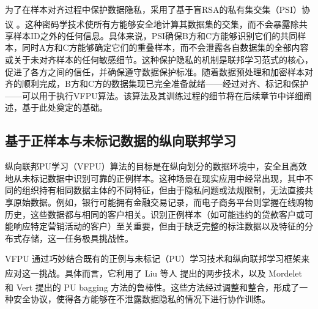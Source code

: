 为了在样本对齐过程中保护数据隐私，采用了基于盲RSA的私有集交集（PSI）协议 \textsuperscript{\cite{de2010practical}}。这种密码学技术使所有方能够安全地计算其数据集的交集，而不会暴露除共享样本ID之外的任何信息。具体来说，PSI确保B方和C方能够识别它们的共同样本，同时A方和C方能够确定它们的重叠样本，而不会泄露各自数据集的全部内容或关于未对齐样本的任何敏感细节。这种保护隐私的机制是联邦学习范式的核心，促进了各方之间的信任，并确保遵守数据保护标准。随着数据预处理和加密样本对齐的顺利完成，B方和C方的数据集现已完全准备就绪——经过对齐、标记和保护——可以用于执行VFPU算法。该算法及其训练过程的细节将在后续章节中详细阐述，基于此处奠定的基础。


\subsection{基于正样本与未标记数据的纵向联邦学习}
纵向联邦PU学习（VFPU）算法的目标是在纵向划分的数据环境中，安全且高效地从未标记数据中识别可靠的正例样本。这种场景在现实应用中经常出现，其中不同的组织持有相同数据主体的不同特征，但由于隐私问题或法规限制，无法直接共享原始数据。例如，银行可能拥有金融交易记录，而电子商务平台则掌握在线购物历史，这些数据都与相同的客户相关。识别正例样本（如可能违约的贷款客户或可能响应特定营销活动的客户）至关重要，但由于缺乏完整的标注数据以及特征的分布式存储，这一任务极具挑战性。

VFPU 通过巧妙结合既有的正例与未标记（PU）学习技术和纵向联邦学习框架来应对这一挑战。具体而言，它利用了 Liu 等人 \textsuperscript{\cite{liu2003building}} 提出的两步技术，以及 Mordelet 和 Vert \textsuperscript{\cite{mordelet2014bagging}} 提出的 PU bagging 方法的鲁棒性。这些方法经过调整和整合，形成了一种安全协议，使得各方能够在不泄露数据隐私的情况下进行协作训练。


